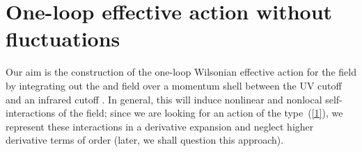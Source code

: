 \documentclass[a4paper,12pt]{article}
\providecommand{\re}[1]{~(\ref{#1})}\usepackage{useful_macros}
\begin{document}
\section{One-loop effective action without \myHighlight{$\mn$}\coordHE{} fluctuations}
\label{without}

Our aim is the construction of the one-loop Wilsonian effective action
for the \myHighlight{$\mn$}\coordHE{} field by integrating out the \coordHE{} and \myHighlight{$\mW$}\coordHE{} field over a
momentum shell between the UV cutoff \myHighlight{$\Lambda$}\coordHE{} and an infrared cutoff
\coordHE{}. In general, this will induce nonlinear and nonlocal
self-interactions of the \myHighlight{$\mn$}\coordHE{} field; since we are looking for an
action of the type\re{1}, we represent these interactions in a
derivative expansion and neglect higher derivative terms of order
\coordHE{} (later, we shall question
this approach).
\end{document}
